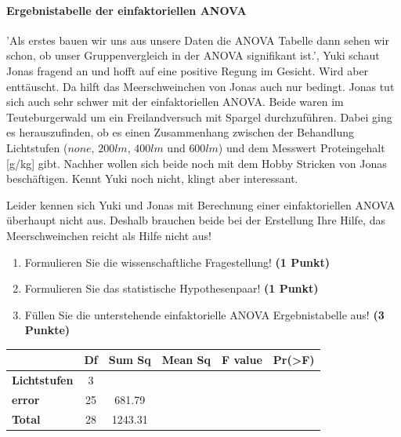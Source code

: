 \documentclass[a4paper, 9pt]{scrartcl}\usepackage[]{graphicx}\usepackage[]{xcolor}
\begin{document}
\ifcollection
\paragraph{Ergebnistabelle der einfaktoriellen ANOVA}
\fi

'Als erstes bauen wir uns aus unsere Daten die ANOVA Tabelle dann sehen wir schon, ob unser Gruppenvergleich in der ANOVA signifikant ist.', Yuki schaut Jonas fragend an und hofft auf eine positive Regung im Gesicht. Wird aber enttäuscht. Da hilft das Meerschweinchen von Jonas auch nur bedingt. Jonas tut sich auch sehr schwer mit der einfaktoriellen ANOVA. Beide waren im Teuteburgerwald um ein Freilandversuch mit Spargel durchzuführen. Dabei ging es herauszufinden, ob es einen Zusammenhang zwischen der Behandlung Lichtstufen ($none$, $200lm$, $400lm$ und $600lm$) und dem Messwert Proteingehalt [g/kg] gibt. Nachher wollen sich beide noch mit dem Hobby Stricken von Jonas beschäftigen. Kennt Yuki noch nicht, klingt aber interessant.



\vspace{1ex}

Leider kennen sich Yuki und Jonas mit Berechnung einer einfaktoriellen ANOVA überhaupt nicht aus. Deshalb brauchen beide bei der Erstellung Ihre Hilfe, das Meerschweinchen reicht als Hilfe nicht aus! 

\begin{enumerate}
  \item Formulieren Sie die wissenschaftliche Fragestellung! \textbf{(1 Punkt)}
  \item Formulieren Sie das statistische Hypothesenpaar! \textbf{(1 Punkt)}
\item Füllen Sie die unterstehende einfaktorielle ANOVA Ergebnistabelle aus! \textbf{(3 Punkte)}
\end{enumerate}

\vspace{1Ex}

\begin{center}
  \Large
  \begin{tabular}{lccccp{3cm}}
\toprule
     & \textbf{Df} & \textbf{Sum Sq} & \textbf{Mean Sq} & \textbf{F value} & \textbf{Pr(>F)} \strut\\
    \midrule
   \textbf{Lichtstufen}  & 3 &  &  &  &  \strut\\
   \textbf{error}  & 25 & 681.79 &  &  &  \strut\\
   \textbf{Total}  & 28 & 1243.31 &  &  &  \strut\\
\bottomrule
  \end{tabular}
\end{center}
\end{document}
